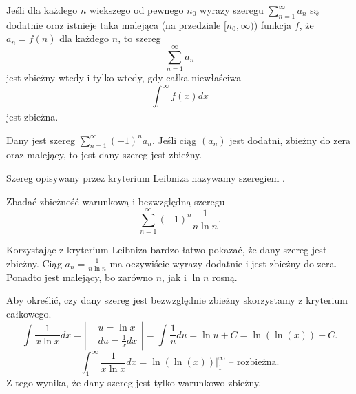 \begin{theorem}
    Jeśli dla każdego $n$ wiekszego od pewnego $n_0$ wyrazy szeregu $\sum_{n=1}^\infty a_n$ są dodatnie oraz istnieje taka malejąca (na przedziale $[n_0, \infty)$) funkcja $f$, że $a_n = f(n)$ dla każdego $n$, to szereg
    \[ \sum_{n=1}^\infty a_n \]
    jest zbieżny wtedy i tylko wtedy, gdy całka niewłaściwa
    \[ \int_1^\infty f(x) dx \]
    jest zbieżna.
\end{theorem}

\begin{theorem}
    Dany jest szereg $\sum_{n=1}^\infty (-1)^na_n$. Jeśli ciąg $(a_n)$ jest dodatni, zbieżny do zera oraz malejący, to jest dany szereg jest zbieżny.
\end{theorem}

Szereg opisywany przez kryterium Leibniza nazywamy szeregiem .

\begin{example}
    Zbadać zbieżność warunkową i bezwzględną szeregu
    \[ \sum_{n=1}^\infty (-1)^n \frac{1}{n\ln{n}}. \]
\end{example}
\begin{solution}
    Korzystając z kryterium Leibniza bardzo łatwo pokazać, że dany szereg jest zbieżny. Ciąg $a_n = \frac{1}{n\ln{n}}$ ma oczywiście wyrazy dodatnie i jest zbieżny do zera. Ponadto jest malejący, bo zarówno $n$, jak i $\ln{n}$ rosną.

    Aby określić, czy dany szereg jest bezwzględnie zbieżny skorzystamy z kryterium całkowego.
    \[ \int \frac{1}{x\ln{x}} dx = \left|\begin{alignedat}{2}&u = \ln{x} \\ &du = \frac{1}{x} dx\end{alignedat}\right| = \int \frac{1}{u} du = \ln{u} + C = \ln(\ln(x)) + C. \]
    \[ \int_1^\infty \frac{1}{x\ln{x}} dx = \ln(\ln(x)) \Big|_1^\infty \text{ -- rozbieżna.} \]
    Z tego wynika, że dany szereg jest tylko warunkowo zbieżny.
\end{solution}